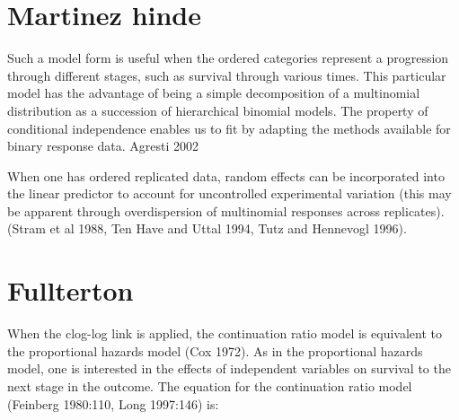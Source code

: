 \section{Martinez hinde}

Such a model form is useful when the ordered categories represent a progression through different stages, such as survival through various times. This particular model has the advantage of being a simple decomposition of a multinomial distribution as a succession of hierarchical binomial models. The property of conditional independence enables us to fit by adapting the methods available for binary response data. Agresti 2002

When one has ordered replicated data, random effects can be incorporated into the linear predictor to account for uncontrolled experimental variation (this may be apparent through overdispersion of multinomial responses across replicates). (Stram et al 1988, Ten Have and Uttal 1994, Tutz and Hennevogl 1996).

\section{Fullterton}




When the clog-log link is applied, the continuation ratio model is equivalent to the proportional hazards model (Cox 1972). As in the proportional hazards model, one is interested in the effects of independent variables on survival to the next stage in the outcome. The equation for the continuation ratio model (Feinberg 1980:110, Long 1997:146) is:

